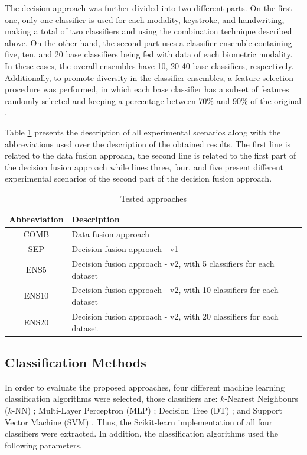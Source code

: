 \documentclass[conference]{IEEEtran}
\begin{document}
The decision approach was further divided into two different parts. On the first one, only one classifier is used for each modality, keystroke, and handwriting, making a total of two classifiers and using the combination technique described above. 
On the other hand, the second part uses a classifier ensemble containing five, ten, and 20 base classifiers being fed with data of each biometric modality. In these cases, the overall ensembles have 10, 20 40 base classifiers, respectively. Additionally, to promote diversity in the classifier ensembles, a feature selection procedure was performed, in which each base classifier has a subset of features randomly selected and keeping a percentage between 70\% and 90\% of the original \cite{dietterich-ensemble}. 

Table \ref{tab:approaches} presents the description of all experimental scenarios along with the abbreviations used over the description of the obtained results. The first line is related to the data fusion approach, the second line is related to the first part of the decision fusion approach while lines three, four, and five present different experimental scenarios of the second part of the decision fusion approach.

\begin{table}[H]
    \centering
    \caption{Tested approaches}
    \label{tab:approaches}
    \begin{tabular}{|c|p{6cm}|}
        \hline
         \textbf{Abbreviation} & \textbf{Description} \\ \hline
         COMB & Data fusion approach \\ \hline
         SEP & Decision fusion approach - v1 \\ \hline
         ENS5 & Decision fusion approach - v2,  with 5 classifiers for each dataset \\ \hline
         ENS10 & Decision fusion approach - v2,  with 10 classifiers for each dataset \\ \hline
         ENS20 & Decision fusion approach - v2,  with 20 classifiers for each dataset \\ \hline
    \end{tabular}
\end{table}

\subsection{Classification Methods}

In order to evaluate the proposed approaches, four different machine learning classification algorithms were selected, those classifiers are: $k$-Nearest Neighbours ($k$-NN) \cite{knn}; Multi-Layer Perceptron (MLP) \cite{mlp}; Decision Tree (DT) \cite{dt}; and Support Vector Machine (SVM) \cite{svm}. Thus, the Scikit-learn \cite{sklearn} implementation of all four classifiers were extracted. In addition, the classification algorithms used the following parameters.
\end{document}

